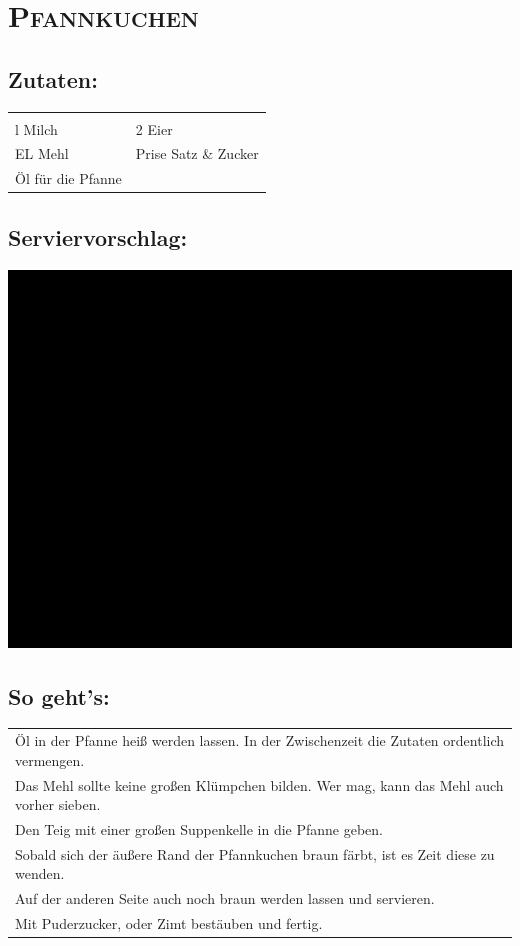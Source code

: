 \section{\textsc{Pfannkuchen}}

\subsection*{Zutaten:}

\begin{tabular}{p{7.5cm} p{7.5cm}}
	& \\
	\sfrac{1}{4}l Milch & 2 Eier \\
	EL Mehl & Prise Satz \& Zucker \\
  Öl für die Pfanne
\end{tabular}

\subsection*{Serviervorschlag:}

\includegraphics[width=\textwidth]{img/ph.jpg}

\subsection*{So geht's:}

\begin{tabular}{p{15cm}}
	\\
  Öl in der Pfanne heiß werden lassen. In der Zwischenzeit die Zutaten ordentlich vermengen.\\
  Das Mehl sollte keine großen Klümpchen bilden. Wer mag, kann das Mehl auch vorher sieben.\\
  Den Teig mit einer großen Suppenkelle in die Pfanne geben.\\
  Sobald sich der äußere Rand der Pfannkuchen braun färbt, ist es Zeit diese zu wenden. \\
  Auf der anderen Seite auch noch braun werden lassen und servieren.\\
  Mit Puderzucker, oder Zimt bestäuben und fertig.
\end{tabular}
